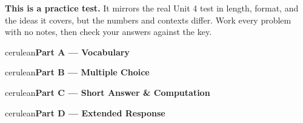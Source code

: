 \documentclass[10pt]{article}
\newcommand{\parthead}[1]{%
  \vspace{6pt}\noindent
  \begin{headlinebox}{cerulean}{\color{white}\bfseries #1}\end{headlinebox}%
  \vspace{4pt}}
\begin{document}
\namedateperiod

\vspace{0.10in}
\begin{remindbox}
\small
\textbf{This is a practice test.} It mirrors the real Unit 4 test in length, format,
and the ideas it covers, but the numbers and contexts differ. Work every problem
with no notes, then check your answers against the key.
\end{remindbox}

\parthead{Part A --- Vocabulary}

\parthead{Part B --- Multiple Choice}

\parthead{Part C --- Short Answer \& Computation}

\parthead{Part D --- Extended Response}
\end{document}
